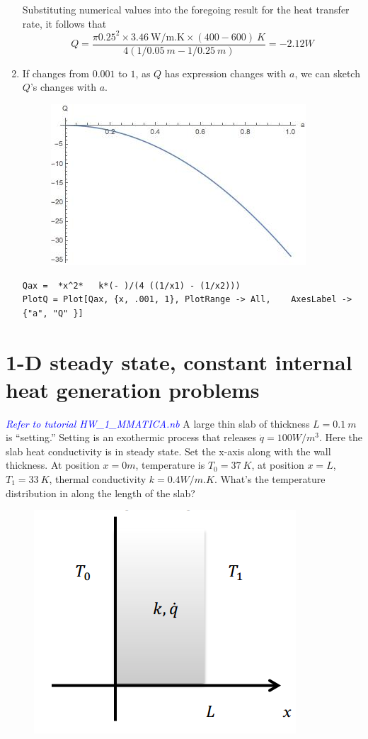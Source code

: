 \begin{solution}
\begin{enumerate}
Substituting numerical values into the foregoing result for the heat 
transfer rate, it follows that
$$Q=\frac{\pi 0.25^2\times3.46~\text{W/m.K}\times(400-600)~K}{4(1/0.05~m - 1/0.25~m)}=-2.12W$$
\item
If changes from $0.001$ to $1$, as $Q$ has expression changes with $a$,
we can sketch $Q$’s changes with $a$.
\begin{figure}[h!]
  \centering
    \includegraphics[scale=0.6]{figures/ch2/5}
\end{figure}
\begin{lstlisting}
Qax =  *x^2*   k*(- )/(4 ((1/x1) - (1/x2)))
PlotQ = Plot[Qax, {x, .001, 1}, PlotRange -> All,    AxesLabel -> {"a", "Q" }]
\end{lstlisting}
\end{enumerate}
\end{solution}

\section{1-D steady state, constant	internal heat generation problems}
\begin{example}
\label{example:23}
\textcolor{blue} {\emph{Refer to tutorial HW\_1\_MMATICA.nb}}
A large thin slab of thickness $L=0.1~m$ is “setting.” Setting is an exothermic process 
that releases $\dot{q}=100W/m^3$. Here the slab heat conductivity is in steady state. 
Set the x-axis along with the wall thickness. At position $x=0m$, temperature is $T_0=37~K$,
at position $x=L$,$T_1=33~K$, thermal conductivity $k=0.4W/m.K$. What’s the
temperature distribution in along the length of the slab? 
\begin{figure}[h!]
  \centering
    \includegraphics[scale=0.6]{figures/ch2/6}
\end{figure}
\end{example}

